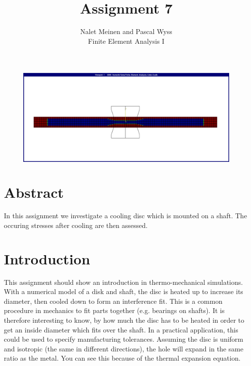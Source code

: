 \documentclass[12pt]{article}
\begin{document}


\title{Assignment 7}%
\author{Nalet Meinen and Pascal Wyss\\ %
Finite Element Analysis I
}
\maketitle

\begin{figure}[!htb]
  \centering
  \vspace*{1cm}
  \includegraphics[trim={-3cm 2cm 2cm 2cm},clip,width=1.0\linewidth]{pics/titelbild}
  \label{fig:0}
\end{figure}

\newpage

\section*{Abstract}
In this assignment we investigate a cooling disc which is mounted on a shaft.
The occuring stresses after cooling are then assessed.

\tableofcontents
\pagebreak
\section{Introduction}

This assignment should show an introduction in thermo-mechanical simulations. With a numerical model of a disk and shaft,  the disc is heated up to increase its diameter, then cooled down to form an interference fit. This is a common procedure in mechanics to fit parts together (e.g. bearings on shafts). It is therefore interesting to know, by how much the disc has to be heated in order to get an inside diameter which fits over the shaft. In a practical application, this could be used to specify manufacturing tolerances.
Assuming the disc is uniform and isotropic (the same in different directions), the hole will expand in the same ratio as the metal. You can see this because of the thermal expansion equation.
\end{document}

